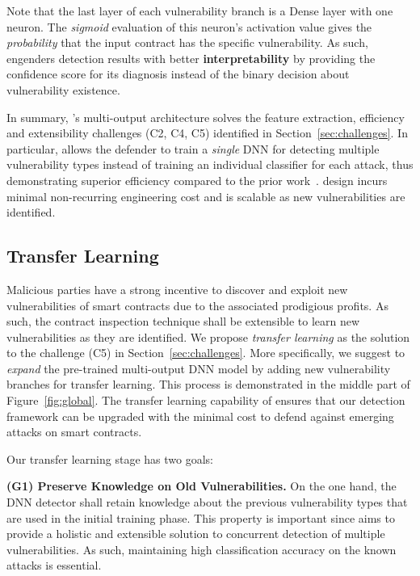 Note that the last layer of each vulnerability branch is a Dense layer with one neuron. 
The \textit{sigmoid} evaluation of this neuron's activation value gives the \textit{probability} that the input contract has the specific vulnerability. 
As such, \sys{} engenders detection results with better \textbf{interpretability} by providing the confidence score for its diagnosis instead of the binary decision about vulnerability existence. 

In summary, \sys{}'s multi-output architecture solves the feature extraction, efficiency and extensibility challenges (C2, C4, C5) identified in Section~\ref{sec:challenges}.
In particular, \sys{} allows the defender to train a \textit{single} DNN for detecting multiple vulnerability types instead of training an individual classifier for each attack, thus demonstrating superior efficiency compared to the prior work~\cite{rw_contractward,huang2018hunting,rw_lstm}. 
\sys{} design incurs minimal non-recurring engineering cost and is scalable as new vulnerabilities are identified. 

\vspace{-0.3em}
\subsection{Transfer Learning} \label{sec:transfer}
\vspace{-0.3em}
Malicious parties have a strong incentive to discover and exploit new vulnerabilities of smart contracts due to the associated prodigious profits. 
As such, the contract inspection technique shall be extensible to learn new vulnerabilities as they are identified.  
We propose \textit{transfer learning} as the solution to the challenge (C5) in Section~\ref{sec:challenges}.
More specifically, we suggest to \textit{expand} the pre-trained multi-output DNN model by adding new vulnerability branches for transfer learning. 
This process is demonstrated in the middle part of Figure~\ref{fig:global}. 
The transfer learning capability of \sys{} ensures that our detection framework can be upgraded with the minimal cost to defend against emerging attacks on smart contracts. 

Our transfer learning stage has two goals: 

\vspace{0.1em}
\textbf{(G1) Preserve Knowledge on Old Vulnerabilities.}
On the one hand, the DNN detector shall retain knowledge about the previous vulnerability types that are used in the initial training phase. 
This property is important since \sys{} aims to provide a holistic and extensible solution to concurrent detection of multiple vulnerabilities. 
As such, maintaining high classification accuracy on the known attacks is essential. 

